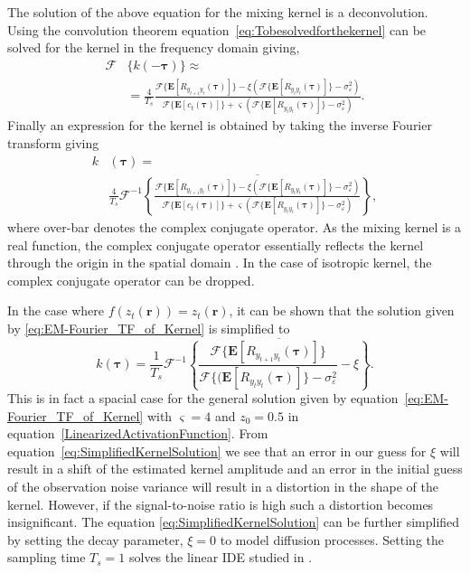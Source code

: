 \documentclass[10pt,twocolumn,twoside]{IEEEtran}
\begin{document}
The solution of the above equation for the mixing kernel is a deconvolution.
Using the convolution theorem equation~\eqref{eq:Tobesolvedforthekernel} can be solved for the kernel in the frequency domain giving,
\begin{align}
	\mathcal{F}&\{k(-\boldsymbol\tau)\} \approx  \nonumber \\
	&= \frac{4}{T_s} \frac{\mathcal{F}\{\mathbf{E}[R_{y_{t+1}y_t}(\boldsymbol{\tau})]\} - \xi\left(\mathcal{F}\{\mathbf{E}[ R_{y_ty_t}(\boldsymbol{\tau})]\} - \sigma_{\varepsilon}^2 \right)} {\mathcal{F}\{\mathbf{E}\left[c_t(\boldsymbol\tau)\right]\} + \varsigma (\mathcal{F}\{\mathbf{E}\left[R_{y_ty_t}(\boldsymbol\tau)\right]\} - \sigma_{\varepsilon}^2 )}.
\label{eq:Fourier_TF_of_Kernel}
\end{align} 
Finally an expression for the kernel is obtained by taking the inverse Fourier transform giving 
\begin{align}\label{eq:EM-Fourier_TF_of_Kernel}   
	k&(\boldsymbol\tau) = \nonumber \\
	&\frac{4}{T_s}\mathcal{F}^{-1}\overline{\left\{ \frac{\mathcal{F}\{\mathbf{E}[R_{y_{t+1}y_t}(\boldsymbol{\tau})]\} - \xi\left(\mathcal{F}\{\mathbf{E}[ R_{y_ty_t}(\boldsymbol{\tau})]\} - \sigma_{\varepsilon}^2 \right)}{\mathcal{F}\{\mathbf{E}\left[c_t(\boldsymbol\tau)\right]\} + \varsigma (\mathcal{F}\{\mathbf{E}\left[R_{y_ty_t}(\boldsymbol\tau)\right]\} - \sigma_{\varepsilon}^2 )} \right\}},
\end{align}
 where over-bar denotes the complex conjugate operator.
As the mixing kernel is a real function, the complex conjugate operator essentially reflects the kernel through the origin in the spatial domain \cite{Bracewell2000}.
In the case of isotropic kernel, the complex conjugate operator can be dropped.


In the case where $f(z_t(\mathbf{r}))=z_t(\mathbf{r})$, it can be shown that the solution given by \eqref{eq:EM-Fourier_TF_of_Kernel} is simplified to  
\begin{equation}\label{eq:SimplifiedKernelSolution}
	k(\boldsymbol\tau) = \frac{1}{T_s }\mathcal{F}^{-1}\overline{\left\{\frac{\mathcal{F}\{\mathbf{E}[R_{y_{t+1}y_t}(\boldsymbol{\tau})]\}}{\mathcal{F}\{(\mathbf{E}\left[R_{y_ty_t}(\boldsymbol\tau)\right]\} - \sigma_{\varepsilon}^2 }-\xi\right\}}.
\end{equation}
This is in fact a spacial case for the general solution given by equation~\eqref{eq:EM-Fourier_TF_of_Kernel} with $\varsigma=4$ and $z_0=0.5$ in equation~\eqref{LinearizedActivationFunction}.
From equation~\eqref{eq:SimplifiedKernelSolution} we see that an error in our guess for $\xi$ will result in a shift of the estimated kernel amplitude and an error in the initial guess of the observation noise variance will result in a distortion in the shape of the kernel.
However, if the signal-to-noise ratio is high such a distortion becomes insignificant.
The equation \eqref{eq:SimplifiedKernelSolution} can be further simplified by setting the decay parameter, $\xi=0$ to model diffusion processes.
Setting the sampling time $T_s=1$ solves the linear IDE studied in \cite{Dewar2009, Scerri2009}.
\end{document}
